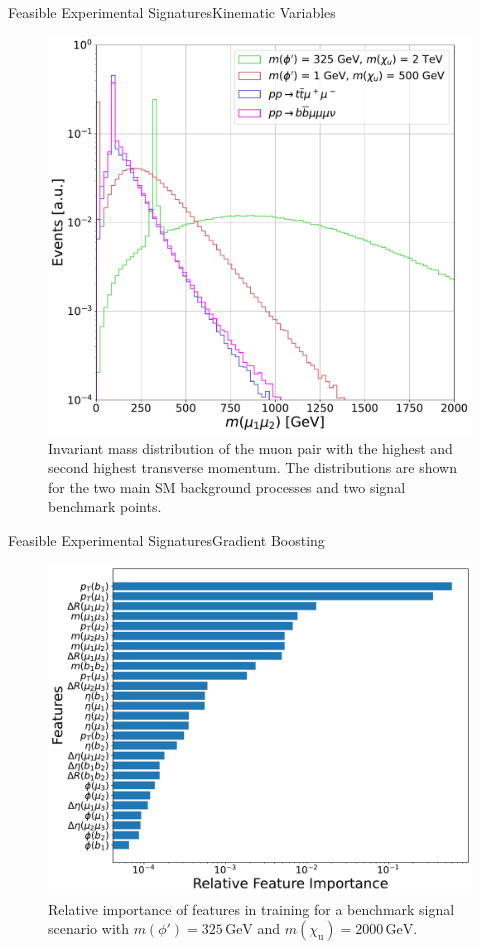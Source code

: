\documentclass{../bredelebeamer}
\begin{document}
\begin{frame}{Feasible Experimental Signatures}{Kinematic Variables}
	\begin{figure}
	\centering
	\includegraphics[width=.6\linewidth]{M_mu_1_2.pdf}
	\caption{Invariant mass distribution of the muon pair with the highest and second highest transverse momentum. The distributions are shown for the two main SM background processes and two signal benchmark points.\label{fig:_mu12}}
	\end{figure}
\end{frame}




\begin{frame}{Feasible Experimental Signatures}{Gradient Boosting}
	\begin{figure}
		\centering
		\includegraphics[width=.6\linewidth]{feature_importance.pdf}
		\caption{Relative importance of features in training for a benchmark signal scenario with $m(\phi')=325\, \mathrm{GeV}$ and $m(\chi_\mathrm{u})=2000\, \mathrm{GeV}$.}
		\label{fig:feature_importance}
	\end{figure}
	
\end{frame}
\end{document}
